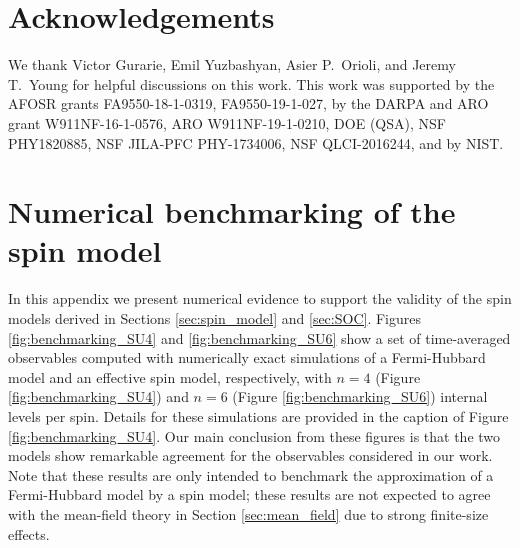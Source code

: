 \documentclass[aps,pra,nofootinbib,twocolumn,superscriptaddress]{revtex4-2}
\newcommand{\1}{\mathds{1}}
\begin{document}
\section*{Acknowledgements}

We thank Victor Gurarie, Emil Yuzbashyan, Asier P.~Orioli, and Jeremy T.~Young for helpful discussions on this work.
This work was supported by the AFOSR grants FA9550-18-1-0319, FA9550-19-1-027, by the DARPA and ARO grant W911NF-16-1-0576, ARO W911NF-19-1-0210, DOE (QSA), NSF PHY1820885, NSF JILA-PFC PHY-1734006, NSF QLCI-2016244, and by NIST.


\onecolumngrid
\appendix

\section{Numerical benchmarking of the spin model}
\label{sec:benchmarking}

In this appendix we present numerical evidence to support the validity of the spin models derived in Sections \ref{sec:spin_model} and \ref{sec:SOC}.
Figures \ref{fig:benchmarking_SU4} and \ref{fig:benchmarking_SU6} show a set of time-averaged observables computed with numerically exact simulations of a Fermi-Hubbard model and an effective spin model, respectively, with $n=4$ (Figure \ref{fig:benchmarking_SU4}) and $n=6$ (Figure \ref{fig:benchmarking_SU6}) internal levels per spin.
Details for these simulations are provided in the caption of Figure \ref{fig:benchmarking_SU4}.
Our main conclusion from these figures is that the two models show remarkable agreement for the observables considered in our work.
Note that these results are only intended to benchmark the approximation of a Fermi-Hubbard model by a spin model; these results are not expected to agree with the mean-field theory in Section \ref{sec:mean_field} due to strong finite-size effects.
\end{document}
